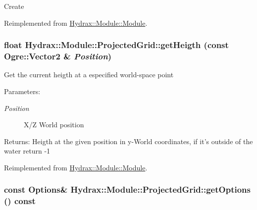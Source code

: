 Create 

Reimplemented from \hyperlink{class_hydrax_1_1_module_1_1_module_4b696328c3fc1496f757e929f44f3258}{Hydrax::Module::Module}.\hypertarget{class_hydrax_1_1_module_1_1_projected_grid_a7a5b8100642a55f23b4d1c0a125bd62}{
\subsubsection[{getHeigth}]{\setlength{\rightskip}{0pt plus 5cm}float Hydrax::Module::ProjectedGrid::getHeigth (const Ogre::Vector2 \& {\em Position})}}
\label{class_hydrax_1_1_module_1_1_projected_grid_a7a5b8100642a55f23b4d1c0a125bd62}


Get the current heigth at a especified world-space point \begin{Desc}
\item[Parameters:]
\begin{description}
\item[{\em Position}]X/Z World position \end{description}
\end{Desc}
\begin{Desc}
\item[Returns:]Heigth at the given position in y-World coordinates, if it's outside of the water return -1 \end{Desc}


Reimplemented from \hyperlink{class_hydrax_1_1_module_1_1_module_c61f89589d3b1bc7256731ddb7af7d0b}{Hydrax::Module::Module}.\hypertarget{class_hydrax_1_1_module_1_1_projected_grid_0a0aaa55436af95f5cf16aa284d24f57}{
\subsubsection[{getOptions}]{\setlength{\rightskip}{0pt plus 5cm}const {\bf Options}\& Hydrax::Module::ProjectedGrid::getOptions () const}}
\label{class_hydrax_1_1_module_1_1_projected_grid_0a0aaa55436af95f5cf16aa284d24f57}


